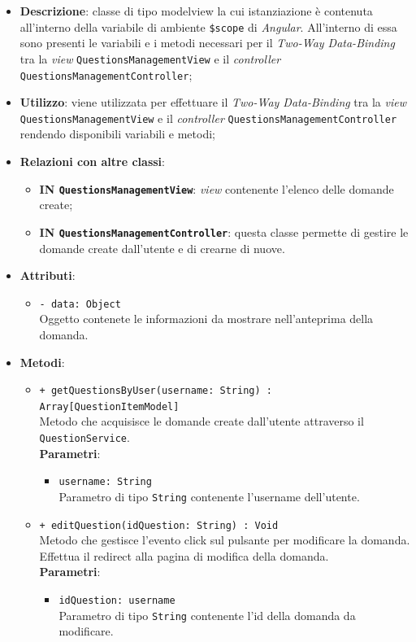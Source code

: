\begin{itemize}
	\item \textbf{Descrizione}: classe di tipo modelview la cui istanziazione è contenuta all'interno della variabile di ambiente \texttt{\$scope} di \textit{Angular}. All'interno di essa sono presenti le variabili e i metodi necessari per il \textit{Two-Way Data-Binding} tra la \textit{view} \texttt{QuestionsManagementView} e il \textit{controller} \texttt{QuestionsManagementController};
	\item \textbf{Utilizzo}: viene utilizzata per effettuare il \textit{Two-Way Data-Binding} tra la \textit{view} \texttt{QuestionsManagementView} e il \textit{controller} \texttt{QuestionsManagementController} rendendo disponibili variabili e metodi;
	\item \textbf{Relazioni con altre classi}: 
	\begin{itemize}
		\item \textbf{IN \texttt{QuestionsManagementView}}: \textit{view} contenente l’elenco delle domande create; 
		\item \textbf{IN \texttt{QuestionsManagementController}}: questa classe permette di gestire le domande create dall’utente e di crearne di nuove.
	\end{itemize}
	\item \textbf{Attributi}: 
	\begin{itemize}
		\item \texttt{- data: Object} \\ Oggetto contenete le informazioni da mostrare nell'anteprima della domanda.
	\end{itemize}
	\item \textbf{Metodi}: 
	\begin{itemize}
			\item \texttt{+ getQuestionsByUser(username: String) : Array[QuestionItemModel]} \\ 
			Metodo che acquisisce le domande create dall'utente attraverso il \texttt{QuestionService}.\\
			\textbf{Parametri}:
			\begin{itemize}
				\item \texttt{username: String} \\
				Parametro di tipo \texttt{String} contenente l'username dell'utente.
			\end{itemize}
			\item \texttt{+ editQuestion(idQuestion: String) : Void} \\ 
			Metodo che gestisce l’evento click sul pulsante per modificare la domanda. Effettua il redirect alla pagina di modifica della domanda. \\
			\textbf{Parametri}:
			\begin{itemize}
				\item \texttt{idQuestion: username} \\
				Parametro di tipo \texttt{String} contenente l'id della domanda da modificare.
			\end{itemize}
	\end{itemize}
\end{itemize}	

